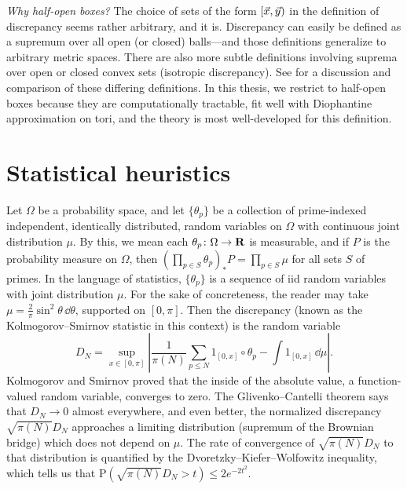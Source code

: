 \emph{Why half-open boxes?} The choice of sets of the form $[\vec{x},\vec{y})$ in the 
definition of discrepancy seems rather arbitrary, and it is. Discrepancy can 
easily be defined as a supremum over all open (or closed) balls---and 
those  definitions generalize to arbitrary metric spaces. There are also more 
subtle definitions involving suprema over open or closed convex sets 
(isotropic discrepancy). See \cite{kuipers-niederreiter-1974} for a discussion 
and comparison of these differing definitions. In this thesis, we restrict to 
half-open boxes because they are computationally tractable, fit well with 
Diophantine approximation on tori, and the theory is most well-developed for 
this definition. 





\section{Statistical heuristics}

Let $\Omega$ be a probability space, and let $\{\theta_p\}$ be a collection of 
prime-indexed independent, identically distributed, random variables on 
$\Omega$ with continuous joint distribution $\mu$. By this, we mean each 
$\theta_p\colon \Omega \to \mathbf{R}$ is measurable, and if $P$ is the probability 
measure on $\Omega$, then 
$\left(\prod_{p\in S} \theta_p\right)_\ast P = \prod_{p\in S} \mu$ for all 
sets $S$ of primes. In 
the language of statistics, $\{\theta_p\}$ is a sequence of iid random 
variables with joint distribution $\mu$. For the sake of concreteness, the 
reader may take $\mu = \frac{2}{\pi} \sin^2 \theta\, \dd\theta$, 
supported on $[0,\pi]$. Then the discrepancy (known as the 
Kolmogorov--Smirnov statistic in this context) is the random variable 
\[
	D_N = \sup_{x\in [0,\pi]} \left|\frac{1}{\pi(N)} \sum_{p\leqslant N} 1_{[0,x]}\circ \theta_p - \int 1_{[0,x]}\, \dd\mu\right| .
\]
Kolmogorov and Smirnov proved that the inside of the absolute value, a 
function-valued random variable, converges 
to zero. The Glivenko--Cantelli theorem says that $D_N \to 0$ almost everywhere, 
and even better, the normalized discrepancy $\sqrt{\pi(N)} D_N$ approaches 
a limiting distribution (supremum of the Brownian bridge) which does not 
depend on $\mu$. The rate of convergence of $\sqrt{\pi(N)} D_N$ to that 
distribution is quantified by the Dvoretzky--Kiefer--Wolfowitz inequality, 
which tells us that 
$\mathrm{P}\left(\sqrt{\pi(N)} D_N > t\right) \leqslant 2 e^{-2 t^2}$. 

